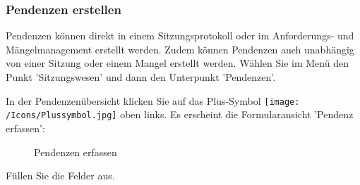 

\subsubsection{Pendenzen erstellen}

Pendenzen können direkt in einem Sitzungsprotokoll oder im Anforderungs- und Mängelmanagement erstellt werden. Zudem können Pendenzen auch unabhängig von einer Sitzung oder einem Mangel erstellt werden. Wählen Sie im Menü den Punkt 'Sitzungswesen' und dann den Unterpunkt 'Pendenzen'.

\vspace{\baselineskip}

In der Pendenzenübersicht klicken Sie auf das Plus-Symbol \texttt{[image: /Icons/Plussymbol.jpg]}  oben links. Es erscheint die Formularansicht 'Pendenz erfassen':

\begin{figure}[H]
\caption{Pendenzen erfassen}
\end{figure}

Füllen Sie die Felder aus.

